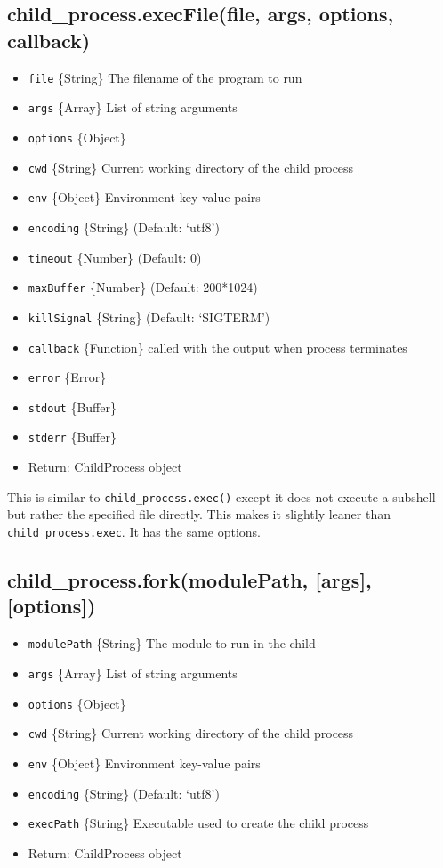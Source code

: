 \subsection{child\_process.execFile(file, args, options, callback)}

\begin{itemize}
\item
  \texttt{file} \{String\} The filename of the program to run
\item
  \texttt{args} \{Array\} List of string arguments
\item
  \texttt{options} \{Object\}
\item
  \texttt{cwd} \{String\} Current working directory of the child process
\item
  \texttt{env} \{Object\} Environment key-value pairs
\item
  \texttt{encoding} \{String\} (Default: `utf8')
\item
  \texttt{timeout} \{Number\} (Default: 0)
\item
  \texttt{maxBuffer} \{Number\} (Default: 200*1024)
\item
  \texttt{killSignal} \{String\} (Default: `SIGTERM')
\item
  \texttt{callback} \{Function\} called with the output when process
  terminates
\item
  \texttt{error} \{Error\}
\item
  \texttt{stdout} \{Buffer\}
\item
  \texttt{stderr} \{Buffer\}
\item
  Return: ChildProcess object
\end{itemize}

This is similar to \texttt{child\_process.exec()} except it does not
execute a subshell but rather the specified file directly. This makes it
slightly leaner than \texttt{child\_process.exec}. It has the same
options.

\subsection{child\_process.fork(modulePath, {[}args{]}, {[}options{]})}

\begin{itemize}
\item
  \texttt{modulePath} \{String\} The module to run in the child
\item
  \texttt{args} \{Array\} List of string arguments
\item
  \texttt{options} \{Object\}
\item
  \texttt{cwd} \{String\} Current working directory of the child process
\item
  \texttt{env} \{Object\} Environment key-value pairs
\item
  \texttt{encoding} \{String\} (Default: `utf8')
\item
  \texttt{execPath} \{String\} Executable used to create the child
  process
\item
  Return: ChildProcess object
\end{itemize}

